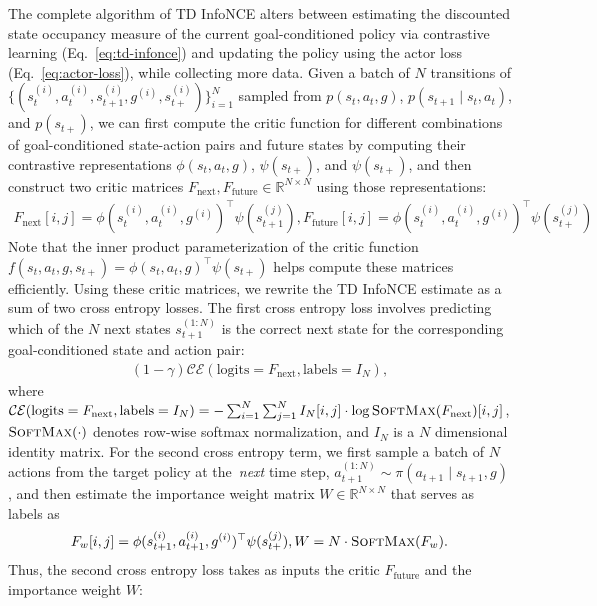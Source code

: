 \documentclass{article} %
\newcommand{\CE}{\mathcal{CE}}
\begin{document}
The complete algorithm of TD InfoNCE alters between estimating the discounted state occupancy measure of the current goal-conditioned policy via contrastive learning (Eq.~\ref{eq:td-infonce}) and updating the policy using the actor loss (Eq.~\ref{eq:actor-loss}), while collecting more data. Given a batch of $N$ transitions of $\{ (s_t^{(i)}, a_t^{(i)}, s_{t + 1}^{(i)}, g^{(i)}, s_{t+}^{(i)}) \}_{i = 1}^N$ sampled from $p(s_t, a_t, g)$, $p(s_{t + 1} \mid s_t, a_t)$, and $p(s_{t+})$, we can first compute the critic function for different combinations of goal-conditioned state-action pairs and future states by computing their contrastive representations $\phi(s_t, a_t, g)$, $\psi(s_{t+})$, and $\psi(s_{t+})$, and then construct two critic matrices $F_{\text{next}}, F_{\text{future}} \in \mathbb{R}^{N \times N}$ using those representations:
\begin{align*}
    F_{\text{next}}[i, j] = \phi(s_t^{(i)}, a_t^{(i)}, g^{(i)})^{\top} \psi(s_{t + 1}^{(j)}), F_{\text{future}}[i, j] = \phi(s_t^{(i)}, a_t^{(i)}, g^{(i)})^{\top} \psi(s_{t+}^{(j)})
\end{align*}
Note that the inner product parameterization of the critic function $f(s_t, a_t, g, s_{t+}) = \phi(s_t, a_t, g)^{\top} \psi(s_{t+})$ helps compute these matrices efficiently. Using these critic matrices, we rewrite the TD InfoNCE estimate as a sum of two cross entropy losses. The first cross entropy loss involves predicting which of the $N$ next states $s_{t + 1}^{(1:N)}$ is the correct next state for the corresponding goal-conditioned state and action pair:
\begin{align*}
    (1 - \gamma) \CE(\text{logits} = F_{\text{next}}, \text{labels} = I_N),
\end{align*}
where $\CE(\text{logits} = F_{\text{next}}, \text{labels} = I_N) = -\sum_{i = 1}^N \sum_{j = 1}^N I_N[i, j] \cdot \log \textsc{SoftMax}(F_{\text{next}})[i, j]$, $\textsc{SoftMax}(\cdot)$ denotes row-wise softmax normalization, and $I_N$ is a $N$ dimensional identity matrix. For the second cross entropy term, we first sample a batch of $N$ actions from the target policy at the~\emph{next} time step, $a_{t + 1}^{(1:N)} \sim \pi(a_{t + 1} \mid s_{t + 1}, g)$, and then estimate the importance weight matrix $W \in \mathbb{R}^{N \times N}$ that serves as labels as
\begin{align*}
    F_w[i, j] = \phi(s_{t + 1}^{(i)}, a_{t + 1}^{(i)}, g^{(i)})^{\top} \psi(s_{t+}^{(j)}), W = N \cdot \textsc{SoftMax}(F_{w}).
\end{align*}
Thus, the second cross entropy loss takes as inputs the critic $F_{\text{future}}$ and the importance weight $W$:
\end{document}
